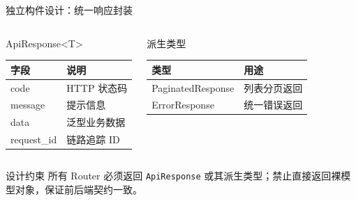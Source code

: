 \documentclass[aspectratio=169,UTF8]{ctexbeamer}
\begin{document}
\begin{frame}{独立构件设计：统一响应封装}
    \begin{columns}[T]
        \begin{block}{ApiResponse\textless T\textgreater}
            \small
            \begin{tabularx}{\linewidth}{lX}
                \toprule
                \textbf{字段} & \textbf{说明} \\
                \midrule
                code & HTTP 状态码 \\
                message & 提示信息 \\
                data & 泛型业务数据 \\
                request\_id & 链路追踪 ID \\
                \bottomrule
            \end{tabularx}
        \end{block}
        \begin{block}{派生类型}
            \small
            \begin{tabularx}{\linewidth}{lX}
                \toprule
                \textbf{类型} & \textbf{用途} \\
                \midrule
                PaginatedResponse & 列表分页返回 \\
                ErrorResponse & 统一错误返回 \\
                \bottomrule
            \end{tabularx}
        \end{block}
    \end{columns}
    \vspace{0.1cm}
    \begin{alertblock}{设计约束}
        所有 Router 必须返回 \texttt{ApiResponse} 或其派生类型；禁止直接返回裸模型对象，保证前后端契约一致。
    \end{alertblock}
\end{frame}
\end{document}
